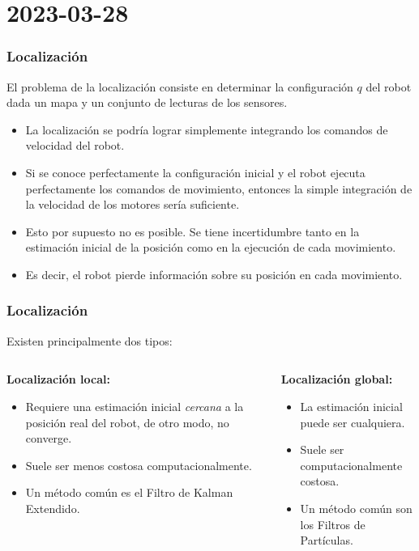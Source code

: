 \section{2023-03-28}
\begin{frame}\frametitle{Localización}
  El problema de la localización consiste en determinar la configuración $q$ del robot dada un mapa y un conjunto de lecturas de los sensores.
  \begin{itemize}
  \item La localización se podría lograr simplemente integrando los comandos de velocidad del robot.
  \item Si se conoce perfectamente la configuración inicial y el robot ejecuta perfectamente los comandos de movimiento, entonces la simple integración de la velocidad de los motores sería suficiente.
  \item Esto por supuesto no es posible. Se tiene incertidumbre tanto en la estimación inicial de la posición como en la ejecución de cada movimiento.
  \item Es decir, el robot pierde información sobre su posición en cada movimiento. 
  \end{itemize}
\end{frame}

\begin{frame}\frametitle{Localización}
  Existen principalmente dos tipos:
\[\]
  \begin{columns}
    \begin{column}{0.5\textwidth}
      \textbf{Localización local: }
      \begin{itemize}
      \item Requiere una estimación inicial \textit{cercana} a la posición real del robot, de otro modo, no converge.
      \item Suele ser menos costosa computacionalmente.
      \item Un método común es el Filtro de Kalman Extendido.
      \end{itemize}
    \end{column}
    \begin{column}{0.5\textwidth}
      \textbf{Localización global:}
      \begin{itemize}
      \item La estimación inicial puede ser cualquiera.
      \item Suele ser computacionalmente costosa.
      \item Un método común son los Filtros de Partículas. 
      \end{itemize}
      \[\]
      \[\]
    \end{column}
  \end{columns}
\end{frame}

